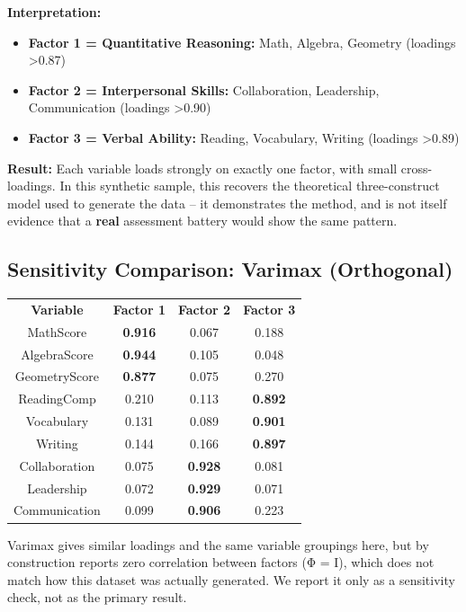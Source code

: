 \documentclass[
]{article}
\begin{document}
\textbf{Interpretation:}

\begin{itemize}
\item
  \textbf{Factor 1 = Quantitative Reasoning:} Math, Algebra, Geometry
  (loadings \textgreater0.87)
\item
  \textbf{Factor 2 = Interpersonal Skills:} Collaboration, Leadership,
  Communication (loadings \textgreater0.90)
\item
  \textbf{Factor 3 = Verbal Ability:} Reading, Vocabulary, Writing
  (loadings \textgreater0.89)
\end{itemize}

\textbf{Result:} Each variable loads strongly on exactly one factor,
with small cross-loadings. In this synthetic sample, this recovers the
theoretical three-construct model used to generate the data -- it
demonstrates the method, and is not itself evidence that a \textbf{real}
assessment battery would show the same pattern.

\subsection{Sensitivity Comparison: Varimax (Orthogonal)}

{\def\LTcaptype{none} %
\begin{longtable}[]{@{}cccc@{}}
\toprule\noalign{}
\endhead
\bottomrule\noalign{}
\endlastfoot
\textbf{Variable} & \textbf{Factor 1} & \textbf{Factor 2} &
\textbf{Factor 3} \\
MathScore & \textbf{0.916} & 0.067 & 0.188 \\
AlgebraScore & \textbf{0.944} & 0.105 & 0.048 \\
GeometryScore & \textbf{0.877} & 0.075 & 0.270 \\
ReadingComp & 0.210 & 0.113 & \textbf{0.892} \\
Vocabulary & 0.131 & 0.089 & \textbf{0.901} \\
Writing & 0.144 & 0.166 & \textbf{0.897} \\
Collaboration & 0.075 & \textbf{0.928} & 0.081 \\
Leadership & 0.072 & \textbf{0.929} & 0.071 \\
Communication & 0.099 & \textbf{0.906} & 0.223 \\
\end{longtable}
}

Varimax gives similar loadings and the same variable groupings here, but
by construction reports zero correlation between factors (Φ = I), which
does not match how this dataset was actually generated. We report it
only as a sensitivity check, not as the primary result.
\end{document}
